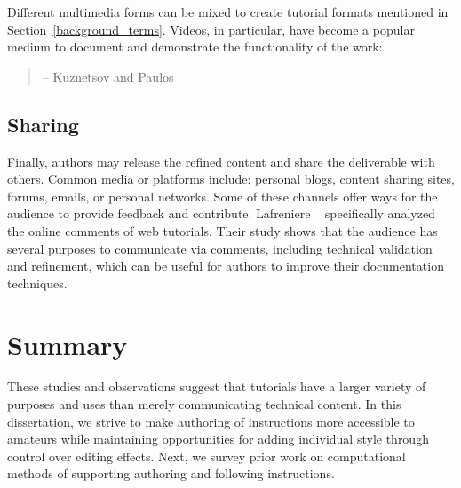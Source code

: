 Different multimedia forms can be mixed to create tutorial formats mentioned in Section~\ref{background_terms}. Videos, in particular, have become a popular medium to document and demonstrate the functionality of the work:

\begin{quote}
 -- Kuznetsov and Paulos~\cite{Kuznetsov:2010:REA:1868914.1868950}
\end{quote}

\subsection{Sharing}
Finally, authors may release the refined content and share the deliverable with others. Common media or platforms include: personal blogs, content sharing sites, forums, emails, or personal networks.
%
Some of these channels offer ways for the audience to provide feedback and contribute. Lafreniere \ea{}~\cite{Lafreniere:2012tl} specifically analyzed the online comments of web tutorials. Their study shows that the audience has several purposes to communicate via comments, including technical validation and refinement, which can be useful for authors to improve their documentation techniques.


\section{Summary}

These studies and observations suggest that tutorials have a larger variety of purposes and uses than merely communicating technical content.
%
In this dissertation, we strive to make authoring of instructions more accessible to amateurs while maintaining opportunities for adding individual style through control over editing effects.
%
Next, we survey prior work on computational methods of supporting authoring and following instructions.
